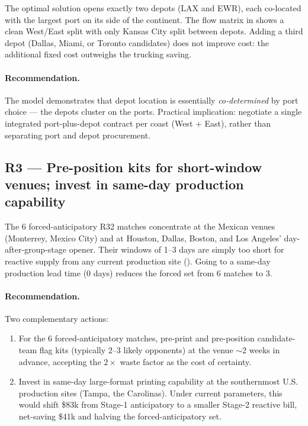 \documentclass[11pt,a4paper]{article}
\numberwithin{equation}{section}
\newcommand{\USD}[1]{\$#1}
\begin{document}
The optimal solution opens exactly two depots (LAX and EWR), each co-located with the largest port on its side of the continent. The flow matrix in  shows a clean West/East split with only Kansas City split between depots. Adding a third depot (Dallas, Miami, or Toronto candidates) does not improve cost: the additional fixed cost outweighs the trucking saving.

\paragraph{Recommendation.} The model demonstrates that depot location is essentially \emph{co-determined} by port choice — the depots cluster on the ports. Practical implication: negotiate a single integrated port-plus-depot contract per coast (West + East), rather than separating port and depot procurement.

\subsection{R3 --- Pre-position kits for short-window venues; invest in same-day production capability}

The 6 forced-anticipatory R32 matches concentrate at the Mexican venues (Monterrey, Mexico City) and at Houston, Dallas, Boston, and Los Angeles' day-after-group-stage opener. Their windows of 1--3 days are simply too short for reactive supply from any current production site (). Going to a same-day production lead time (0 days) reduces the forced set from 6 matches to 3.

\paragraph{Recommendation.} Two complementary actions:
\begin{enumerate}[leftmargin=*,itemsep=2pt,topsep=2pt]
\item For the 6 forced-anticipatory matches, pre-print and pre-position candidate-team flag kits (typically 2--3 likely opponents) at the venue $\sim$2 weeks in advance, accepting the $2\times$ waste factor as the cost of certainty.
\item Invest in same-day large-format printing capability at the southernmost U.S. production sites (Tampa, the Carolinas). Under current parameters, this would shift \USD{83k} from Stage-1 anticipatory to a smaller Stage-2 reactive bill, net-saving \USD{41k} and halving the forced-anticipatory set.
\end{enumerate}
\end{document}
